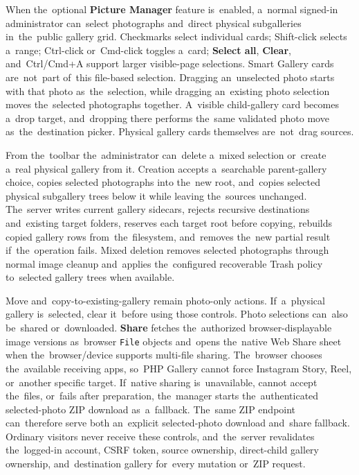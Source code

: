 \documentclass[11pt,a4paper]{article}
\newcommand{\ui}[1]{\textbf{#1}}
\newcommand{\codeword}[1]{\nolinkurl{#1}}
\begin{document}
When the~optional \ui{Picture Manager} feature is~enabled, a~normal signed-in
administrator can~select photographs and~direct physical subgalleries
in~the~public gallery grid. Checkmarks select individual cards; Shift-click
selects a~range; Ctrl-click or~Cmd-click toggles a~card; \ui{Select all},
\ui{Clear}, and~Ctrl/Cmd+A support larger visible-page selections. Smart Gallery
cards are~not~part of~this file-based selection. Dragging an~unselected photo
starts with that photo as~the~selection, while dragging an~existing photo
selection moves the~selected photographs together. A~visible child-gallery card
becomes a~drop target, and~dropping there performs the~same validated photo move
as~the~destination picker. Physical gallery cards themselves are~not~drag
sources.

From the~toolbar the~administrator can~delete a~mixed selection or~create a~real
physical gallery from it. Creation accepts a~searchable parent-gallery choice,
copies selected photographs into the~new root, and~copies selected physical
subgallery trees below it while leaving the~sources unchanged. The~server writes
current gallery sidecars, rejects recursive destinations and~existing target
folders, reserves each target root before copying, rebuilds copied gallery rows
from~the~filesystem, and~removes the~new partial result if~the~operation fails.
Mixed deletion removes selected photographs through normal image cleanup
and~applies the~configured recoverable Trash policy to~selected gallery trees
when available.

Move and~copy-to-existing-gallery remain photo-only actions. If~a~physical
gallery is~selected, clear it~before using those controls. Photo selections
can~also be~shared or~downloaded. \ui{Share} fetches the~authorized
browser-displayable image versions as~browser \codeword{File} objects and~opens
the~native Web Share sheet when the~browser/device supports multi-file sharing.
The~browser chooses the~available receiving apps, so~PHP Gallery cannot force
Instagram Story, Reel, or~another specific target. If~native sharing
is~unavailable, cannot accept the~files, or~fails after preparation, the~manager
starts the~authenticated selected-photo ZIP download as~a~fallback. The~same ZIP
endpoint can~therefore serve both an~explicit selected-photo download and~share
fallback. Ordinary visitors never receive these controls, and~the~server
revalidates the~logged-in account, CSRF token, source ownership, direct-child
gallery ownership, and~destination gallery for~every mutation or~ZIP request.
\end{document}
